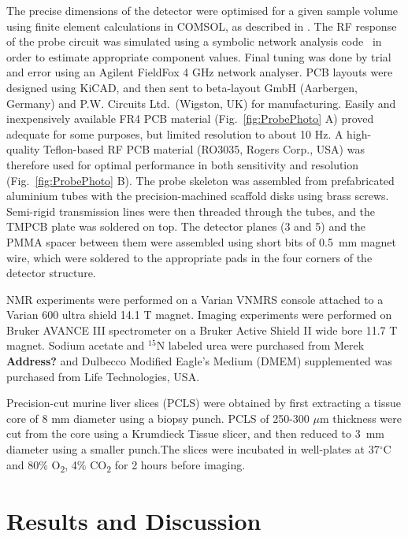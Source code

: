 \documentclass[preprint,12pt]{article}
\newcommand{\todo}[1]{{\color{red}\textbf{#1}}}
\newcommand{\fig}[1]{Fig.~\ref{#1}}
\begin{document}
The precise dimensions of the detector were optimised for a given sample volume using 
finite element calculations in COMSOL, as described in \cite{gream_2016}. 
The RF response of the probe circuit was simulated using a symbolic  
network analysis code~\cite{gream-thesis} in order to estimate appropriate component values. Final tuning
was done by trial and error using an Agilent FieldFox 4 GHz network analyser. 
PCB layouts were designed using KiCAD, and then sent to
beta-layout GmbH (Aarbergen, Germany) and P.W. Circuits Ltd.~(Wigston, UK) 
for manufacturing. Easily and inexpensively available FR4 PCB material
(\fig{fig:ProbePhoto} A) proved adequate for some purposes, but limited resolution to about 10 Hz.
A high-quality Teflon-based RF PCB material (RO3035, Rogers Corp., USA) was therefore used for optimal 
performance in both sensitivity and resolution (\fig{fig:ProbePhoto} B).
The probe skeleton was assembled from prefabricated aluminium tubes with the  precision-machined scaffold
disks using brass screws. Semi-rigid transmission lines were then threaded through the tubes, and the TMPCB plate was 
soldered on top. The detector planes (3 and 5) and the PMMA spacer between them were assembled using short bits
of 0.5~mm magnet wire, which were soldered to the appropriate pads in the four corners of the detector structure.

NMR experiments were performed on a Varian VNMRS console attached to a Varian 600 ultra shield 14.1 T magnet.  
Imaging experiments were performed on Bruker AVANCE III spectrometer on a Bruker Active Shield II wide bore 11.7 T 
magnet. 
Sodium acetate and $^{15}$N labeled urea were purchased from Merek \todo{Address?} and Dulbecco Modified Eagle's Medium (DMEM) supplemented was purchased from Life Technologies, USA.\par

Precision-cut murine liver slices (PCLS) were obtained by first extracting a tissue core of 8 mm diameter 
using a biopsy punch. PCLS of 250-300 $\mu$m thickness were cut from the core using a Krumdieck Tissue slicer, 
and then reduced to 3~mm diameter using a smaller punch.The slices were incubated in well-plates at 37$^\circ$C and 80\%
O\textsubscript{2}, 4\% CO\textsubscript{2}
for 2 hours before imaging.


\section{Results and Discussion}
\end{document}
